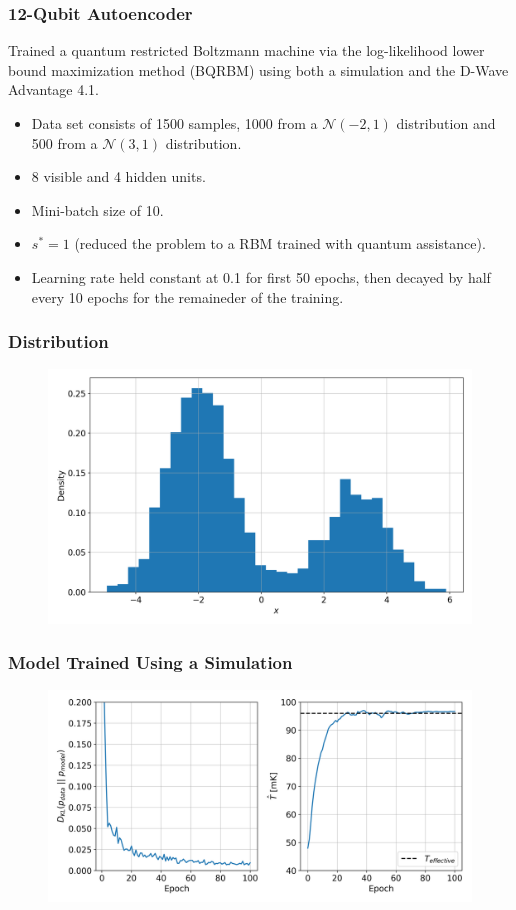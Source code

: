 \documentclass{beamer}
\begin{document}
\begin{frame}
    \frametitle{12-Qubit Autoencoder}
    Trained a quantum restricted Boltzmann machine via the log-likelihood lower bound maximization method (BQRBM) using both a simulation and the D-Wave Advantage 4.1.
    \begin{itemize}
        \item Data set consists of 1500 samples, 1000 from a \( \mathcal{N}(-2, 1) \) distribution and 500 from a \( \mathcal{N}(3, 1) \) distribution.
        \item 8 visible and 4 hidden units.
        \item Mini-batch size of 10.
        \item \( s^* = 1 \) (reduced the problem to a RBM trained with quantum assistance).
        \item Learning rate held constant at 0.1 for first 50 epochs, then decayed by half every 10 epochs for the remaineder of the training.
    \end{itemize}
\end{frame}

\begin{frame}
    \frametitle{Distribution}
    \begin{figure}
        \includegraphics[width=1\linewidth]{qbm/8x4/Advantage_system4.1/hist_data.png}
    \end{figure}
\end{frame}

\begin{frame}
    \frametitle{Model Trained Using a Simulation}
    \begin{figure}
        \includegraphics[width=1\linewidth]{qbm/8x4/Advantage_system4.1/train_results_exact.png}
    \end{figure}
\end{frame}
\end{document}
